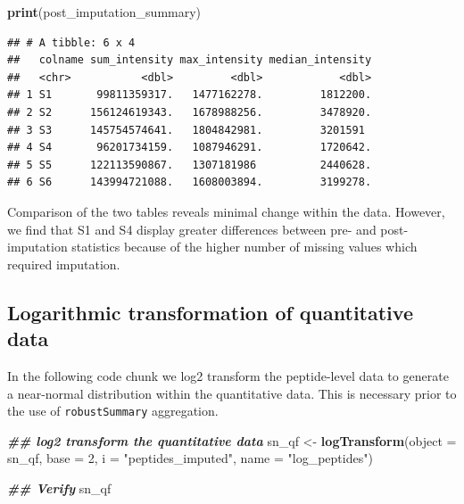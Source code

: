\documentclass[9pt,a4paper,]{extarticle}
\newenvironment{Shaded}{\begin{snugshade}}{\end{snugshade}}
\newcommand{\AttributeTok}[1]{\textcolor[rgb]{0.13,0.29,0.53}{#1}}
\newcommand{\DecValTok}[1]{\textcolor[rgb]{0.00,0.00,0.81}{#1}}
\newcommand{\DocumentationTok}[1]{\textcolor[rgb]{0.56,0.35,0.01}{\textbf{\textit{#1}}}}
\newcommand{\FunctionTok}[1]{\textcolor[rgb]{0.13,0.29,0.53}{\textbf{#1}}}
\newcommand{\NormalTok}[1]{#1}
\newcommand{\OtherTok}[1]{\textcolor[rgb]{0.56,0.35,0.01}{#1}}
\newcommand{\StringTok}[1]{\textcolor[rgb]{0.31,0.60,0.02}{#1}}
\begin{document}
\begin{Shaded}
\begin{Highlighting}[]
\FunctionTok{print}\NormalTok{(post\_imputation\_summary)}
\end{Highlighting}
\end{Shaded}

\begin{verbatim}
## # A tibble: 6 x 4
##   colname sum_intensity max_intensity median_intensity
##   <chr>           <dbl>         <dbl>            <dbl>
## 1 S1       99811359317.   1477162278.         1812200.
## 2 S2      156124619343.   1678988256.         3478920.
## 3 S3      145754574641.   1804842981.         3201591 
## 4 S4       96201734159.   1087946291.         1720642.
## 5 S5      122113590867.   1307181986          2440628.
## 6 S6      143994721088.   1608003894.         3199278.
\end{verbatim}

Comparison of the two tables reveals minimal change within the data. However, we
find that S1 and S4 display greater differences between pre- and post-imputation
statistics because of the higher number of missing values which required
imputation.

\hypertarget{logarithmic-transformation-of-quantitative-data-1}{%
\subsection{Logarithmic transformation of quantitative data}\label{logarithmic-transformation-of-quantitative-data-1}}

In the following code chunk we log2 transform the peptide-level data to generate
a near-normal distribution within the quantitative data. This is necessary prior
to the use of \texttt{robustSummary} aggregation.

\begin{Shaded}
\begin{Highlighting}[]
\DocumentationTok{\#\# log2 transform the quantitative data}
\NormalTok{sn\_qf }\OtherTok{\textless{}{-}} \FunctionTok{logTransform}\NormalTok{(}\AttributeTok{object =}\NormalTok{ sn\_qf,}
                      \AttributeTok{base =} \DecValTok{2}\NormalTok{,}
                      \AttributeTok{i =} \StringTok{"peptides\_imputed"}\NormalTok{,}
                      \AttributeTok{name =} \StringTok{"log\_peptides"}\NormalTok{)}

\DocumentationTok{\#\# Verify}
\NormalTok{sn\_qf}
\end{Highlighting}
\end{Shaded}
\end{document}
